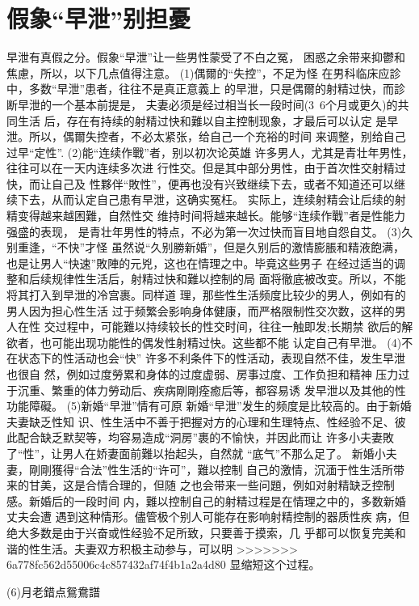 \documentclass[12pt,UTF8]{ctexbook}
\begin{document}
\section{假象“早泄”别担憂}

早泄有真假之分。假象“早泄”让一些男性蒙受了不白之冤，
困惑之余带来抑鬱和焦慮，所以，以下几点值得注意。
(1)偶爾的“失控”，不足为怪
在男科临床应診中，多数“早泄”患者，往往不是真正意義上
的早泄，只是偶爾的射精过快，而診断早泄的一个基本前提是，
夫妻必须是经过相当长一段时间(3~6个月或更久)的共同生活
后，存在有持续的射精过快和難以自主控制现象，才最后可以认定
是早泄。所以，偶爾失控者，不必太紧张，给自己一个充裕的时间
来调整，别给自己过早“定性”.
(2)能“连续作戰”者，别以初次论英雄
许多男人，尤其是青壮年男性，往往可以在一天内连续多次进
行性交。但是其中部分男性，由于首次性交射精过快，而让自己及
性夥伴“敗性”，便再也没有兴致继续下去，或者不知道还可以继
续下去，从而认定自己患有早泄，这确实冤枉。
实际上，连续射精会让后续的射精变得越来越困難，自然性交
维持时间将越来越长。能够“连续作戰”者是性能力强盛的表现，
是青壮年男性的特点，不必为第一次过快而盲目地自怨自艾。
(3)久别重逢，“不快”才怪
虽然说“久别勝新婚”，但是久别后的激情膨脹和精液飽满，
也是让男人“快速”敗陣的元兇，这也在情理之中。毕竟这些男子
在经过适当的调整和后续规律性生活后，射精过快和難以控制的局
面将徹底被改变。所以，不能将其打入到早泄的冷宫裹。同样道
理，那些性生活频度比较少的男人，例如有的男人因为担心性生活
过于频繁会影响身体健康，而严格限制性交次数，这样的男人在性
交过程中，可能難以持续较长的性交时间，往往一触即发;长期禁
欲后的解欲者，也可能出现功能性的偶发性射精过快。这些都不能
认定自己有早泄。
(4)不在状态下的性活动也会“快”
许多不利条件下的性活动，表现自然不佳，发生早泄也很自
然，例如过度勞累和身体的过度虚弱、房事过度、工作负担和精神
压力过于沉重、繁重的体力勞动后、疾病剛剛痊癒后等，都容易诱
发早泄以及其他的性功能障礙。
(5)新婚“早泄”情有可原
新婚“早泄”发生的频度是比较高的。由于新婚夫妻缺乏性知
识、性生活中不善于把握对方的心理和生理特点、性经验不足、彼
此配合缺乏默契等，均容易造成“洞房”裹的不愉快，并因此而让
许多小夫妻敗了“性”，让男人在娇妻面前難以抬起头，自然就
“底气”不那么足了。
新婚小夫妻，剛剛獲得“合法”性生活的“许可”，難以控制
自己的激情，沉湎于性生活所带来的甘美，这是合情合理的，但随
之也会带来一些问題，例如对射精缺乏控制感。新婚后的一段时间
内，難以控制自己的射精过程是在情理之中的，多数新婚丈夫会遭
遇到这种情形。儘管极个别人可能存在影响射精控制的器质性疾
病，但绝大多数是由于兴奋或性经验不足所致，只要善于摸索，几
乎都可以恢复完美和谐的性生活。夫妻双方积极主动参与，可以明
>>>>>>> 6a778fc562d55006c4c857432af74f4b1a2a4d80
显缩短这个过程。

(6)月老錯点鴛鴦譜
\end{document}
